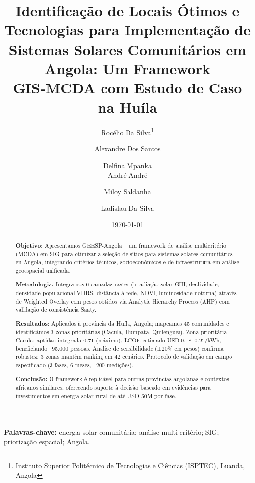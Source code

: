 \documentclass[12pt, a4paper]{article}
\begin{document}
\title{Identificação de Locais Ótimos e Tecnologias para Implementação de Sistemas Solares Comunitários em Angola: Um Framework GIS‑MCDA com Estudo de Caso na Huíla}
\author{Rocélio Da Silva\thanks{Instituto Superior Politécnico de Tecnologias e Ciências (ISPTEC), Luanda, Angola} \and Alexandre Dos Santos\footnotemark[1] \and Delfina Mpanka\footnotemark[1] \\
André André\footnotemark[1] \and Miloy Saldanha\footnotemark[1] \and Ladislau Da Silva\footnotemark[1]}
\date{\today}
\maketitle

\begin{abstract}
\textbf{Objetivo:} Apresentamos GEESP-Angola – um framework de análise multicritério (MCDA) em SIG para otimizar a seleção de sítios para sistemas solares comunitários en Angola, integrando critérios técnicos, socioeconómicos e de infraestrutura em análise geoespacial unificada.

\textbf{Metodologia:} Integramos 6 camadas raster (irradiação solar GHI, declividade, densidade populacional VIIRS, distância à rede, NDVI, luminosidade noturna) através de Weighted Overlay com pesos obtidos via Analytic Hierarchy Process (AHP) com validação de consistência Saaty.

\textbf{Resultados:} Aplicados à província da Huíla, Angola; mapeamos 45 comunidades e identificámos 3 zonas prioritárias (Cacula, Humpata, Quilengues). Zona prioritária Cacula: aptidão integrada 0.71 (máximo), LCOE estimado USD 0.18–0.22/kWh, beneficiando ~95.000 pessoas. Análise de sensibilidade (±20\% em pesos) confirma robustez: 3 zonas mantêm ranking em 42 cenários. Protocolo de validação em campo especificado (3 fases, 6 meses, ~200 medições).

\textbf{Conclusão:} O framework é replicável para outras províncias angolanas e contextos africanos similares, oferecendo suporte à decisão baseado em evidências para investimentos em energia solar rural de até USD 50M por fase.
\end{abstract}
\vspace{6pt}
\noindent\textbf{Palavras-chave:} energia solar comunitária; análise multi-critério; SIG; priorização espacial; Angola.
\end{document}
